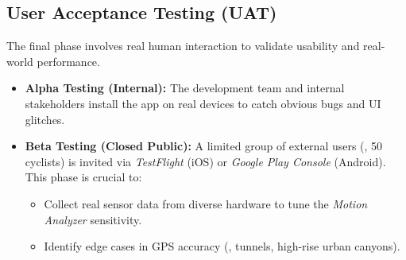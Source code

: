 \subsection*{User Acceptance Testing (UAT)}
The final phase involves real human interaction to validate usability and real-world performance.
\begin{itemize}
    \item \textbf{Alpha Testing (Internal):} The development team and internal stakeholders install the app on real devices to catch obvious bugs and UI glitches.
    \item \textbf{Beta Testing (Closed Public):} A limited group of external users (\eg, 50 cyclists) is invited via \emph{TestFlight} (iOS) or \emph{Google Play Console} (Android). This phase is crucial to:
    \begin{itemize}
        \item Collect real sensor data from diverse hardware to tune the \emph{Motion Analyzer} sensitivity.
        \item Identify edge cases in GPS accuracy (\eg, tunnels, high-rise urban canyons).
    \end{itemize}
\end{itemize}